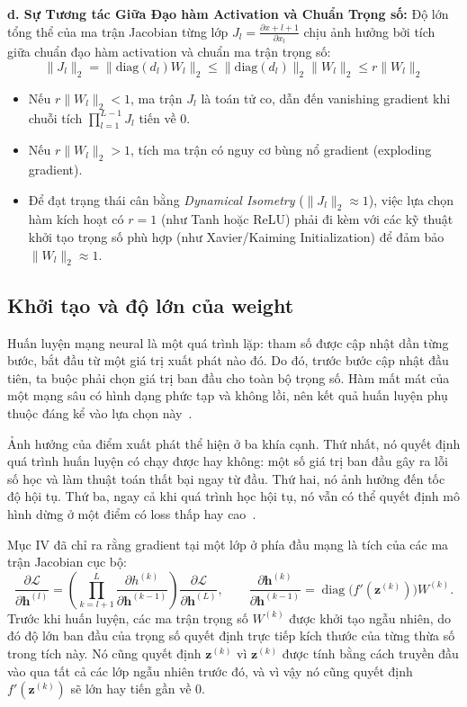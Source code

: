 \documentclass[12pt]{article}
\begin{document}
\textbf{d. Sự Tương tác Giữa Đạo hàm Activation và Chuẩn Trọng số:} Độ lớn tổng thể của ma trận Jacobian từng lớp $J_l = \frac{\partial x+{l+1}}{\partial x_l}$ chịu ảnh hưởng bởi tích giữa chuẩn đạo hàm activation và chuẩn ma trận trọng số:
\begin{equation}
    \|J_l\|_2 = \|\text{diag}(d_l) W_l\|_2 \le \|\text{diag}(d_l)\|_2 \|W_l\|_2 \le r \|W_l\|_2
\end{equation}

\begin{itemize}
    \item Nếu $r \|W_l\|_2 < 1$, ma trận $J_l$ là toán tử co, dẫn đến vanishing gradient khi chuỗi tích $\prod_{l=1}^{L-1} J_l$ tiến về $0$.
    \item Nếu $r \|W_l\|_2 > 1$, tích ma trận có nguy cơ bùng nổ gradient (exploding gradient).
    \item Để đạt trạng thái cân bằng \textit{Dynamical Isometry} ($\|J_l\|_2 \approx 1$), việc lựa chọn hàm kích hoạt có $r = 1$ (như Tanh hoặc ReLU) phải đi kèm với các kỹ thuật khởi tạo trọng số phù hợp (như Xavier/Kaiming Initialization) để đảm bảo $\|W_l\|_2 \approx 1$.
\end{itemize}

\subsection{Khởi tạo và độ lớn của weight}
\label{subsec:weight_init}

Huấn luyện mạng neural là một quá trình lặp: tham số được cập nhật dần từng bước, bắt đầu từ một giá trị xuất phát nào đó. Do đó, trước bước cập nhật đầu tiên, ta buộc phải chọn giá trị ban đầu cho toàn bộ trọng số. Hàm mất mát của một mạng sâu có hình dạng phức tạp và không lồi, nên kết quả huấn luyện phụ thuộc đáng kể vào lựa chọn này~\cite[\S8.4]{long-goodfellow2016}.

Ảnh hưởng của điểm xuất phát thể hiện ở ba khía cạnh. Thứ nhất, nó quyết định quá trình huấn luyện có chạy được hay không: một số giá trị ban đầu gây ra lỗi số học và làm thuật toán thất bại ngay từ đầu. Thứ hai, nó ảnh hưởng đến tốc độ hội tụ. Thứ ba, ngay cả khi quá trình học hội tụ, nó vẫn có thể quyết định mô hình dừng ở một điểm có loss thấp hay cao~\cite[\S8.4]{long-goodfellow2016}.

Mục IV đã chỉ ra rằng gradient tại một lớp ở phía đầu mạng là tích của các ma trận Jacobian cục bộ:
\[ \frac{\partial \mathcal{L}}{\partial \mathbf{h}^{(l)}} = \left( \prod_{k=l+1}^{L} \frac{\partial h^{(k)}}{\partial \mathbf{h}^{(k-1)}} \right) \frac{\partial \mathcal{L}}{\partial \mathbf{h}^{(L)}}, \qquad \frac{\partial \mathbf{h}^{(k)}}{\partial \mathbf{h}^{(k-1)}} = \operatorname{diag}\big( f'(\mathbf{z}^{(k)}) \big) W^{(k)}. \]
Trước khi huấn luyện, các ma trận trọng số $W^{(k)}$ được khởi tạo ngẫu nhiên, do đó độ lớn ban đầu của trọng số quyết định trực tiếp kích thước của từng thừa số trong tích này. Nó cũng quyết định $\mathbf{z}^{(k)}$ vì $\mathbf{z}^{(k)}$ được tính bằng cách truyền đầu vào qua tất cả các lớp ngẫu nhiên trước đó, và vì vậy nó cũng quyết định $f'(\mathbf{z}^{(k)})$ sẽ lớn hay tiến gần về 0.
\end{document}
